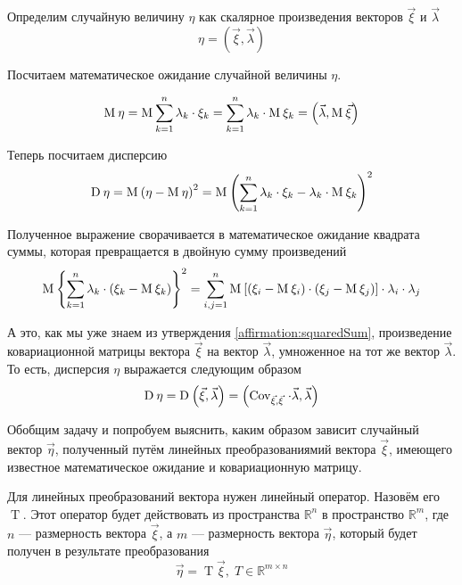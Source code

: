 Определим случайную величину $\eta$ как скалярное произведения векторов
$\vec{\xi}$ и $\vec{\lambda}$
$$\eta = \left( \vec{\xi}, \vec{\lambda} \right)$$

Посчитаем математическое ожидание случайной величины $\eta$.

\begin{equation}\label{eq:scalarMulMean}
    \operatorname{M}_{} \eta
        = \operatorname{M}_{} \sum_{k=1}^{n} \lambda_k \cdot \xi_k
        = \sum_{k=1}^{n} \lambda_k \cdot \operatorname{M}_{} \xi_k
        = \left( \vec{\lambda}, \operatorname{M}_{} \vec{\xi} \right)
\end{equation}

Теперь посчитаем дисперсию
$$\operatorname{D}_{} \eta
    = \operatorname{M}_{} \left( \eta - \operatorname{M}_{} \eta \right)^2
    = \operatorname{M}_{} \left( \sum_{k=1}^{n} \lambda_k \cdot \xi_k
        - \lambda_k \cdot \operatorname{M}_{} \xi_k \right)^2$$

Полученное выражение сворачивается в математическое ожидание квадрата суммы,
которая превращается в двойную сумму произведений
$$\operatorname{M}_{} \left\{ \sum_{k=1}^{n} \lambda_k
    \cdot \left( \xi_k - \operatorname{M}_{} \xi_k \right) \right\}^2
    = \sum_{i,j=1}^{n}\operatorname{M}_{} \left[ \left( \xi_i - \operatorname{M}_{} \xi_i \right)
            \cdot \left( \xi_j - \operatorname{M}_{} \xi_j \right) \right]
        \cdot \lambda_i \cdot \lambda_j$$

А это, как мы уже знаем из утверждения \ref{affirmation:squaredSum},
произведение ковариационной матрицы вектора $\vec{\xi}$
на вектор $\vec{\lambda}$, умноженное на тот же вектор $\vec{\lambda}$.
То есть, дисперсия $\eta$ выражается следующим образом
\begin{equation}\label{eq:linearQuadraticForm}
\operatorname{D}_{} \eta
    = \operatorname{D}_{} \left( \vec{\xi}, \vec{\lambda} \right)
    = \left( \operatorname{Cov}_{\vec{\xi}, \vec{\xi}}\, \cdot \vec{\lambda}, \vec{\lambda} \right)
\end{equation}

Обобщим задачу и попробуем выяснить, каким образом зависит случайный вектор
$\vec{\eta}$, полученный путём линейных преобразованиямий вектора $\vec{\xi}$,
имеющего известное математическое ожидание и ковариационную матрицу.

Для линейных преобразований вектора нужен линейный оператор. Назовём его
$\operatorname{T}$. Этот оператор будет действовать из пространства
$\mathbb{R}^n$
в пространство $\mathbb{R}^m$, где $n$ --- размерность вектора $\vec{\xi}$,
а $m$ --- размерность вектора $\vec{\eta}$, который будет получен
в результате преобразования
$$\vec{\eta} = \operatorname{T} \vec{\xi} ,\; T \in \mathbb{R}^{m \times n}$$

